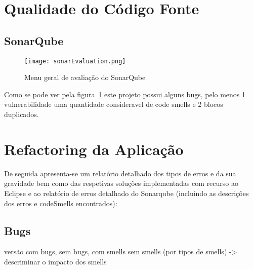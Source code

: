 \section{Qualidade do Código Fonte}

\subsection{SonarQube}

\begin{figure}[H]

  \centering

  \texttt{[image: sonarEvaluation.png]}

  \caption {Menu geral de avaliação do SonarQube}

  \label {fig01}

\end{figure}


\par Como se pode ver pela figura~\ref{fig01} este projeto possui alguns bugs, pelo menos 1 vulnerabilidade uma quantidade consideravel de code smells e 2 blocos duplicados.

\section{Refactoring da Aplicação}

De seguida apresenta-se um relatório detalhado dos tipos de erros e da sua gravidade bem como das respetivas soluções implementadas com recurso ao Eclipse e ao relatório de erros detalhado do Sonarqube (incluindo as descrições dos erros e codeSmells encontrados):

\subsection{Bugs}
versão com bugs, sem bugs, com smells sem smells (por tipos de smells) -> descriminar o impacto dos smells
